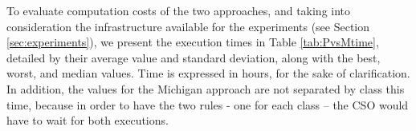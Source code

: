 \documentclass[runningheads]{llncs}
\begin{document}
To evaluate computation costs of the two approaches, and taking into consideration the infrastructure available for the experiments (see Section \ref{sec:experiments}), we present the execution times in Table \ref{tab:PvsMtime}, detailed by their average value and standard deviation, along with the best, worst, and median values. Time is expressed in hours, for the sake of clarification. In addition, the values for the Michigan approach are not separated by class this time, because in order to have the two rules - one for each class -- the CSO would have to wait for both executions.
%
\begin{table}[h!tbp]
	\centering
	\caption{Execution time, Pittsburgh and Michigan approaches;
          this one adds times for GRANTED and STRONGDENY. \textbf{$*$} marks  statistically significant best values.}
\end{table}
\end{document}
